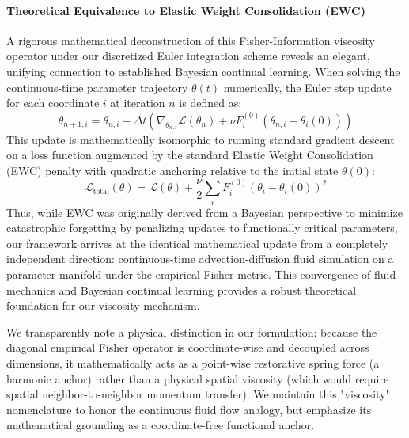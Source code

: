 \paragraph{Theoretical Equivalence to Elastic Weight Consolidation (EWC)}
A rigorous mathematical deconstruction of this Fisher-Information viscosity operator under our discretized Euler integration scheme reveals an elegant, unifying connection to established Bayesian continual learning. When solving the continuous-time parameter trajectory $\theta(t)$ numerically, the Euler step update for each coordinate $i$ at iteration $n$ is defined as:
\begin{equation}
    \theta_{n+1, i} = \theta_{n, i} - \Delta t \left( \nabla_{\theta_{n, i}} \mathcal{L}(\theta_n) + \nu F_i^{(0)} \left( \theta_{n, i} - \theta_i(0) \right) \right)
\end{equation}
This update is mathematically isomorphic to running standard gradient descent on a loss function augmented by the standard Elastic Weight Consolidation (EWC) penalty \cite{kirkpatrick2017overcoming} with quadratic anchoring relative to the initial state $\theta(0)$:
\begin{equation}
    \mathcal{L}_{\text{total}}(\theta) = \mathcal{L}(\theta) + \frac{\nu}{2} \sum_i F_i^{(0)} \left( \theta_i - \theta_i(0) \right)^2
\end{equation}
Thus, while EWC was originally derived from a Bayesian perspective to minimize catastrophic forgetting by penalizing updates to functionally critical parameters, our framework arrives at the identical mathematical update from a completely independent direction: continuous-time advection-diffusion fluid simulation on a parameter manifold under the empirical Fisher metric. This convergence of fluid mechanics and Bayesian continual learning provides a robust theoretical foundation for our viscosity mechanism.

We transparently note a physical distinction in our formulation: because the diagonal empirical Fisher operator is coordinate-wise and decoupled across dimensions, it mathematically acts as a point-wise restorative spring force (a harmonic anchor) rather than a physical spatial viscosity (which would require spatial neighbor-to-neighbor momentum transfer). We maintain this "viscosity" nomenclature to honor the continuous fluid flow analogy, but emphasize its mathematical grounding as a coordinate-free functional anchor.
